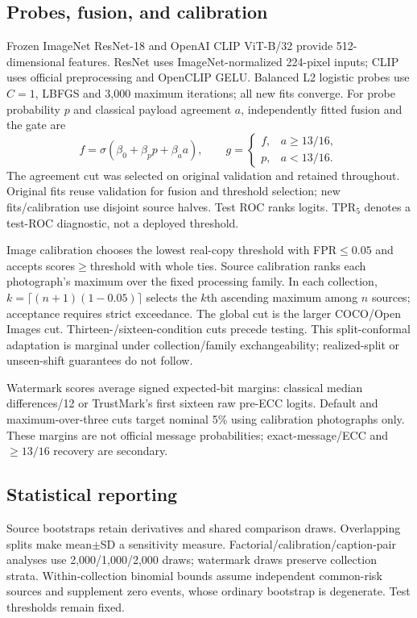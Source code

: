 \documentclass[conference]{IEEEtran}
\begin{document}
\subsection{Probes, fusion, and calibration}
Frozen ImageNet ResNet-18 \cite{resnet} and OpenAI CLIP ViT-B/32
\cite{clip} provide 512-dimensional features. ResNet uses ImageNet-normalized
224-pixel inputs; CLIP uses official preprocessing and OpenCLIP GELU.
Balanced L2 logistic probes use $C=1$, LBFGS and 3,000 maximum iterations;
all new fits converge.
For probe probability $p$ and classical payload agreement $a$, independently fitted
fusion and the gate are
\begin{equation}
f=\sigma(\beta_0+\beta_p p+\beta_a a),\qquad
g=\begin{cases}f,&a\ge13/16,\\p,&a<13/16.\end{cases}
\end{equation}
The agreement cut was selected on original validation and retained throughout.
Original fits
reuse validation for fusion and threshold selection; new fits/calibration
use disjoint source halves. Test ROC ranks logits. TPR$_5$ denotes a
test-ROC diagnostic, not a deployed threshold.

Image calibration chooses the lowest real-copy threshold with FPR$\le0.05$
and accepts scores$\ge$threshold with whole ties. Source calibration ranks each
photograph's maximum over the fixed processing family. In each collection,
$k=\lceil(n+1)(1-0.05)\rceil$ selects the $k$th ascending maximum among $n$
sources; acceptance requires strict exceedance. The global cut is the larger
COCO/Open Images cut. Thirteen-/sixteen-condition cuts precede testing.
This split-conformal adaptation \cite{conformal} is marginal under
collection/family exchangeability; realized-split or unseen-shift guarantees
do not follow.

Watermark scores average signed expected-bit margins: classical median
differences/12 or TrustMark's first sixteen raw pre-ECC logits. Default and
maximum-over-three cuts target nominal 5\% using calibration photographs
only. These margins are not official message probabilities;
exact-message/ECC and $\ge13/16$ recovery are secondary.

\subsection{Statistical reporting}
Source bootstraps retain derivatives and shared comparison draws. Overlapping
splits make mean$\pm$SD a sensitivity measure. Factorial/calibration/caption-pair
analyses use 2,000/1,000/2,000 draws; watermark draws preserve collection
strata. Within-collection binomial bounds assume independent common-risk
sources and supplement zero events, whose ordinary bootstrap is degenerate.
Test thresholds remain fixed.
\end{document}
